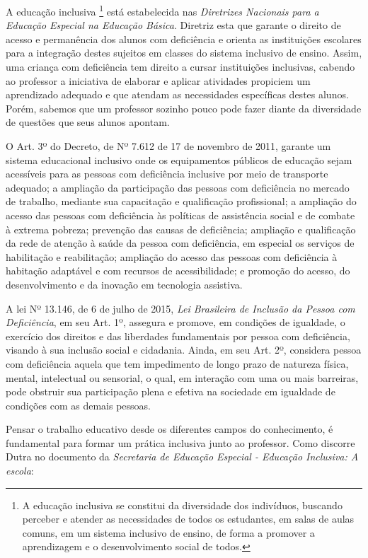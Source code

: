 \documentclass[brasil]{abnt}
\begin{document}
	A educação inclusiva
	\footnote{A educação inclusiva se constitui da diversidade dos 
	indivíduos, buscando perceber e atender as necessidades de todos os 
	estudantes, em salas de aulas comuns, em um sistema inclusivo de 
	ensino, de forma a promover a aprendizagem e o desenvolvimento 
	social de todos.}
	está estabelecida nas \textit{Diretrizes Nacionais para a Educação Especial na Educação Básica}. Diretriz esta que garante o direito de acesso e permanência dos alunos com deficiência e orienta as instituições escolares para a integração destes sujeitos em classes do sistema inclusivo de ensino. Assim, uma criança com deficiência tem direito a cursar instituições 
	inclusivas, cabendo ao professor a iniciativa de elaborar e aplicar atividades propiciem um aprendizado adequado e que atendam as necessidades específicas destes alunos.
	Porém, sabemos que um professor sozinho pouco pode fazer diante da diversidade de questões que seus alunos apontam. 
		
	O Art. 3º do Decreto, de Nº 7.612 de 17 de novembro de 2011, garante um sistema educacional inclusivo onde os equipamentos públicos de educação sejam acessíveis para as pessoas com deficiência 
	inclusive por meio de transporte adequado; a ampliação da participação das pessoas com deficiência no mercado de trabalho, mediante sua capacitação e qualificação profissional; a 
	ampliação do acesso das pessoas com deficiência às políticas de assistência social e de combate à extrema pobreza; prevenção das causas de deficiência; ampliação e qualificação da rede de atenção à saúde 
	da pessoa com deficiência, em especial os serviços de habilitação e reabilitação; ampliação do acesso das pessoas com deficiência à habitação adaptável e com recursos de acessibilidade; e promoção do acesso, 
	do desenvolvimento e da inovação em tecnologia assistiva. 
						
	A lei Nº 13.146, de 6 de julho de 2015, \textit{Lei Brasileira de Inclusão da Pessoa com Deficiência}, em seu Art. 1º, assegura e promove, em condições de igualdade, o exercício dos direitos 
	e das liberdades fundamentais por pessoa com deficiência, visando à sua inclusão social e cidadania. Ainda, em seu Art. 2º, considera pessoa com deficiência aquela que tem impedimento de longo prazo de natureza 
	física, mental, intelectual ou sensorial, o qual, em interação com uma ou mais barreiras, pode obstruir sua participação plena e efetiva na sociedade em igualdade de condições com as demais pessoas. 
	
	Pensar o trabalho educativo desde os diferentes campos do 
	conhecimento, é fundamental para formar um prática inclusiva junto 
	ao professor. Como discorre Dutra no documento da \textit{Secretaria 
	de Educação Especial - Educação Inclusiva: A escola}:
	
\end{document}
